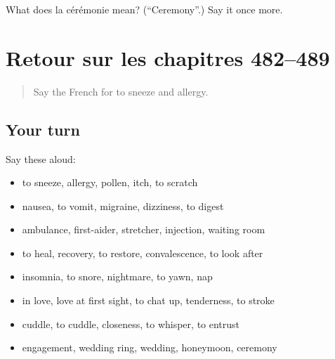 \begin{tcolorbox}[breakable,colback=teal!4,colframe=teal!35!black,title={Before you move on}]
What does la cérémonie mean? (\textquotedblleft{}Ceremony\textquotedblright{}.) Say it once more.
\end{tcolorbox}
\section[(dialogue)]{Retour sur les chapitres 482–489}

\label{lesson:FR-R489-revision-482-489}



\begin{quote}
Say the French for to sneeze and allergy.
\end{quote}

\subsection*{Your turn}
Say these aloud:

\begin{itemize}
\raggedright
  \item to sneeze, allergy, pollen, itch, to scratch
  \item nausea, to vomit, migraine, dizziness, to digest
  \item ambulance, first-aider, stretcher, injection, waiting room
  \item to heal, recovery, to restore, convalescence, to look after
  \item insomnia, to snore, nightmare, to yawn, nap
  \item in love, love at first sight, to chat up, tenderness, to stroke
  \item cuddle, to cuddle, closeness, to whisper, to entrust
  \item engagement, wedding ring, wedding, honeymoon, ceremony
\end{itemize}


